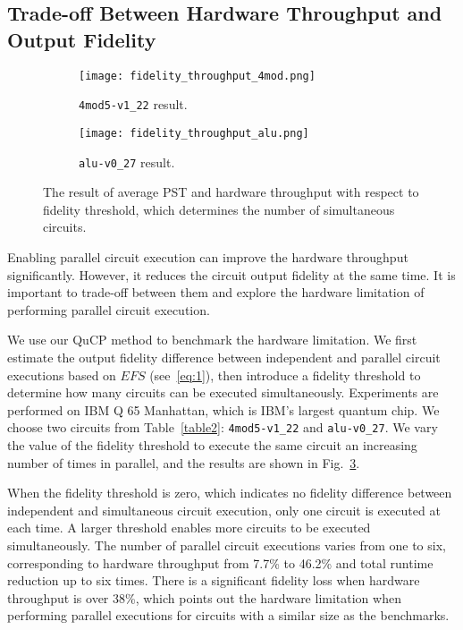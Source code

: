 \documentclass[conference]{IEEEtran}
\begin{document}
\subsection{Trade-off Between Hardware Throughput and Output Fidelity}
\label{section:experiment}
\begin{figure}[t]
\begin{subfigure}{\linewidth}
\centering
\texttt{[image: fidelity\_throughput\_4mod.png]}
\caption{\texttt{4mod5-v1\_22} result.}
\label{fig:4mod}
\end{subfigure}
\hspace{0.15cm}
\begin{subfigure}{\linewidth}
\centering
\texttt{[image: fidelity\_throughput\_alu.png]}
\caption{\texttt{alu-v0\_27} result.}
\label{fig:alu}
\end{subfigure}
\caption{The result of average PST and hardware throughput with respect to fidelity threshold, which determines the number of simultaneous circuits.}
\label{fig:limitation}

\end{figure}

Enabling parallel circuit execution can improve the hardware throughput significantly. However, it reduces the circuit output fidelity at the same time. It is important to trade-off between them and explore the hardware limitation of performing parallel circuit execution. 

We use our QuCP method to benchmark the hardware limitation. We first estimate the output fidelity difference between independent and parallel circuit executions based on $EFS$ (see~\eqref{eq:1}), then introduce a fidelity threshold to determine how many circuits can be executed simultaneously. Experiments are performed on IBM Q 65 Manhattan, which is IBM's largest quantum chip. We choose two circuits from Table~\ref{table2}: \texttt{4mod5-v1\_22} and \texttt{alu-v0\_27}. We vary the value of the fidelity threshold to execute the same circuit an increasing number of times in parallel, and the results are shown in Fig.~\ref{fig:limitation}.

When the fidelity threshold is zero, which indicates no fidelity difference between independent and simultaneous circuit execution, only one circuit is executed at each time. A larger threshold enables more circuits to be executed simultaneously. The number of parallel circuit executions varies from one to six, corresponding to hardware throughput from 7.7\% to 46.2\% and total runtime reduction up to six times. There is a significant fidelity loss when hardware throughput is over 38\%, which points out the hardware limitation when performing parallel executions for circuits with a similar size as the benchmarks.  
\end{document}

